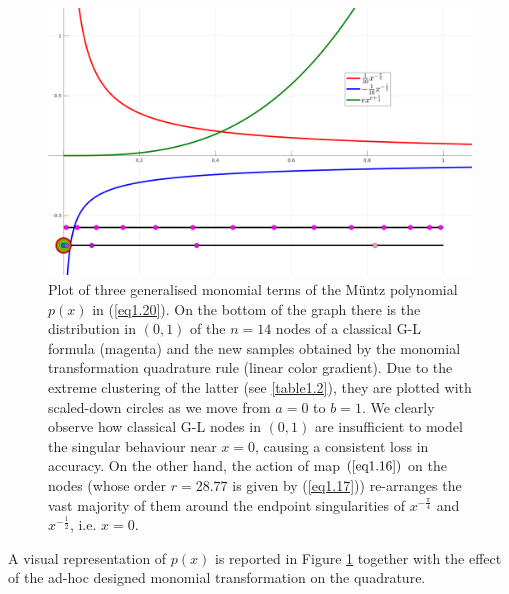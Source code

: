 \documentclass[a4paper, twosided]{book}
\begin{document}
\begin{center}
        \begin{figure}[h]
        \captionsetup{singlelinecheck=off}
        \includegraphics[keepaspectratio,width=\textwidth-1cm]{images/GenPolyMonMap.png}
        \caption{Plot of three generalised monomial terms of the Müntz polynomial $p(x)$ in (\ref{eq1.20}). On the bottom of the graph there is the distribution in $(0,1)$ of the $n=14$ nodes of a classical G-L formula (magenta) and the new samples obtained by the monomial transformation quadrature rule (linear color gradient). Due to the extreme clustering of the latter (see \ref{table1.2}), they are plotted with scaled-down circles as we move from $a=0$ to $b=1$. We clearly observe how classical G-L nodes in $(0,1)$ are insufficient to model the singular behaviour near $x=0$, causing a consistent loss in accuracy. On the other hand, the action of map $(\ref{eq1.16})$ on the nodes (whose order $r=28.77$ is given by (\ref{eq1.17})) re-arranges the vast majority of them around the endpoint singularities of $x^{-\frac{\pi}{4}}$ and $x^{-\frac{1}{2}}$, i.e. $x=0$.}
        \label{Fig1.2}
        \end{figure}
\end{center}

\vspace{-1.25cm}
\noindent
A visual representation of $p(x)$ is reported in Figure \ref{Fig1.2} together with the effect of the ad-hoc designed monomial transformation on the quadrature.
\end{document}
